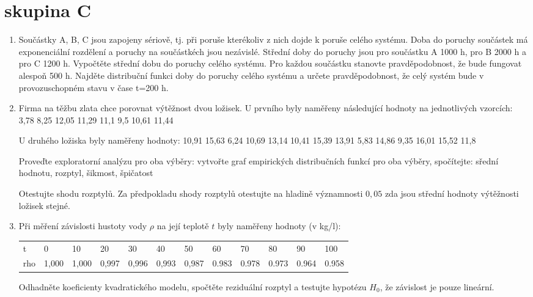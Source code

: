 \documentclass[a4paper,10pt]{article}
\begin{document}
  \section*{skupina C} 
\begin{enumerate}

\item Součástky A, B, C jsou zapojeny sériově, tj. při poruše kterékoliv z nich dojde k poruše celého systému. Doba do poruchy
      součástek má exponenciální rozdělení a poruchy na součástkéch jsou nezávislé. Střední doby do poruchy jsou pro součástku A 1000 h, pro B 2000 h a pro C 1200 h.
      Vypočtěte střední dobu do poruchy celého systému. Pro každou součástku stanovte pravděpodobnost, že bude fungovat alespoň 500 h. Najděte distribuční funkci doby do poruchy celého systému a určete pravděpodobnost, že celý systém bude v provozuschopném stavu v čase t=200 h. 

  \item Firma na těžbu zlata chce porovnat výtěžnost dvou ložisek. U prvního byly naměřeny následující hodnoty na jednotlivých vzorcích: 3,78 8,25 12,05 11,29 11,1 9,5 10,61 11,44

U druhého ložiska byly naměřeny hodnoty:
10,91 15,63 6,24 10,69 13,14 10,41 15,39 13,91 5,83 14,86
9,35 16,01 15,52 11,8

Proveďte exploratorní analýzu pro oba výběry: vytvořte graf empirických distribučních funkcí pro oba výběry, spočítejte:
sřední hodnotu, rozptyl, šikmost, špičatost

Otestujte shodu rozptylů. 
Za předpokladu shody rozptylů otestujte na hladině významnosti $0,05$ zda jsou střední hodnoty výtěžnosti ložisek stejné.
\item
      Při měření závislosti hustoty vody $\rho$ na její teplotě $t$ byly naměřeny hodnoty (v kg/l):
\begin{center}
      \begin{tabular}{llllllllllll}
       t & 0 & 10 & 20 & 30 & 40 & 50 & 60 & 70 & 80 & 90 & 100 \\
       rho & 1,000 & 1,000 & 0,997 & 0,996 & 0,993 & 0,987 & 0.983 & 0.978 & 0.973 & 0.964 & 0.958
      \end{tabular}

\end{center}
      Odhadněte koeficienty kvadratického modelu, spočtěte reziduální rozptyl a testujte hypotézu $H_0$, že závislost je pouze lineární. 
  \end{enumerate}
\end{document}
